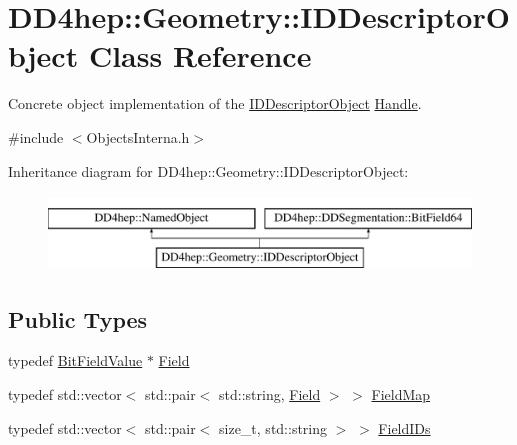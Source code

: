 \hypertarget{class_d_d4hep_1_1_geometry_1_1_i_d_descriptor_object}{}\section{D\+D4hep\+:\+:Geometry\+:\+:I\+D\+Descriptor\+Object Class Reference}
\label{class_d_d4hep_1_1_geometry_1_1_i_d_descriptor_object}


Concrete object implementation of the \hyperlink{class_d_d4hep_1_1_geometry_1_1_i_d_descriptor_object}{I\+D\+Descriptor\+Object} \hyperlink{class_d_d4hep_1_1_handle}{Handle}.  




{\ttfamily \#include $<$Objects\+Interna.\+h$>$}

Inheritance diagram for D\+D4hep\+:\+:Geometry\+:\+:I\+D\+Descriptor\+Object\+:\begin{figure}[H]
\begin{center}
\leavevmode
\includegraphics[height=2.000000cm]{class_d_d4hep_1_1_geometry_1_1_i_d_descriptor_object}
\end{center}
\end{figure}
\subsection*{Public Types}
\begin{DoxyCompactItemize}
\item 
typedef \hyperlink{class_d_d4hep_1_1_d_d_segmentation_1_1_bit_field_value}{Bit\+Field\+Value} $\ast$ \hyperlink{class_d_d4hep_1_1_geometry_1_1_i_d_descriptor_object_acd5cae904f0db0ed0805ef1077ce2111}{Field}
\item 
typedef std\+::vector$<$ std\+::pair$<$ std\+::string, \hyperlink{class_d_d4hep_1_1_geometry_1_1_i_d_descriptor_object_acd5cae904f0db0ed0805ef1077ce2111}{Field} $>$ $>$ \hyperlink{class_d_d4hep_1_1_geometry_1_1_i_d_descriptor_object_a784af03aa08575a914c2399b45eae052}{Field\+Map}
\item 
typedef std\+::vector$<$ std\+::pair$<$ size\+\_\+t, std\+::string $>$ $>$ \hyperlink{class_d_d4hep_1_1_geometry_1_1_i_d_descriptor_object_aa9d779170fd1d2221d27f3b63df6d6d4}{Field\+I\+Ds}
\end{DoxyCompactItemize}
